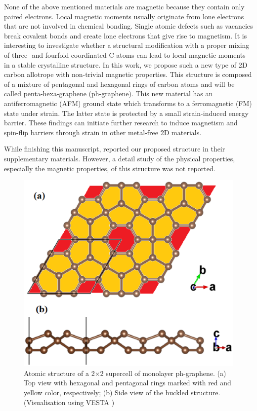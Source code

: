 None of the above mentioned materials are magnetic because they contain only paired electrons. Local magnetic moments usually originate from lone electrons that are not involved in chemical bonding. Single atomic defects such as vacancies break covalent bonds and create lone electrons that give rise to magnetism. It is interesting to investigate whether a structural modification with a proper mixing of three- and fourfold coordinated C atoms can lead to local magnetic moments in a stable crystalline structure.  In this work, we propose such a new type of 2D carbon allotrope with non-trivial magnetic properties. This structure is composed of a mixture of pentagonal and hexagonal rings of carbon atoms and will be called penta-hexa-graphene (ph-graphene). This new material has an antiferromagnetic (AFM) ground state which transforms to a ferromagnetic (FM) state under strain. The latter state is protected by a small strain-induced energy barrier. These findings can initiate further research to induce magnetism and spin-flip barriers through strain in other metal-free 2D materials.

While finishing this manuscript, \citet{Zhang2016} reported our proposed structure in their supplementary materials. However, a detail study of the physical properties, especially the magnetic properties, of this structure was not reported. 

\begin{figure}[htbp]
\centering
\includegraphics[width=0.6\linewidth]{PG_structure.eps}%
\caption{Atomic structure of a 2$\times$2 supercell of monolayer ph-graphene. (a) Top view with hexagonal and pentagonal rings marked with red and yellow color, respectively; (b) Side view of the buckled structure. \label{structure} (Visualisation using VESTA \cite{vesta})}
\end{figure}

